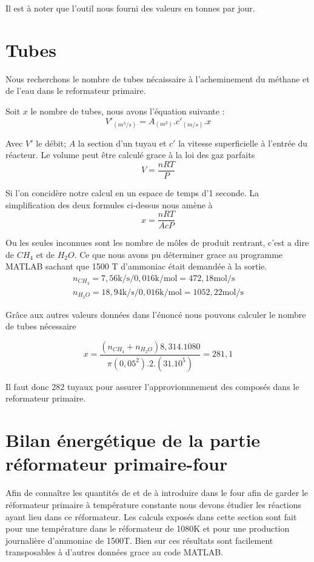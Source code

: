 \documentclass[a4paper, oneside, 12pt]{article}
\begin{document}
Il est à noter que l'outil nous fourni des valeurs en tonnes par jour.

\section{Tubes}

Nous recherchons le nombre de tubes nécaissaire à l'acheminement du 
méthane et de l'eau dans le reformateur primaire.

Soit $x$ le nombre de tubes, nous avons l'équation suivante :
\[
V'_{(m^3/s)} = A_{(m^2)}. c'_{(m/s)} .x
\]

Avec $V'$ le débit; $A$ la section d'un tuyau 
et $c'$ la vitesse superficielle à l'entrée du réacteur.
Le volume peut être calculé grace à la loi des gaz parfaits
\[
V=\frac{nRT}{P}
\]

Si l'on concidère notre calcul en un espace de temps d'1 seconde. 
La simplification des deux formules ci-dessus nous amène à
\[
x=\frac{nRT}{AcP}
\]

Ou les seules inconnues sont les nombre de môles de produit rentrant, 
c'est a dire de $CH_{4}$ et de $H_{2}O$. Ce que nous avons pu déterminer grace au 
programme MATLAB sachant que 1500 T d'ammoniac était demandée à la sortie.
\begin{align*}
	n_{CH_{4}} = 7,56 \si{\kilo\per\second} / 0,016 \si{\kilo\per\mole} 
	= 472,18 \si{\mole\per\second} \\
	n_{H_{2}O} = 18,94 \si{\kilo\per\second}/ 0,016 \si{\kilo\per\mole}
	= 1052,22 \si{\mole\per\second}
\end{align*}

Grâce aux autres valeurs données dans l'énoncé nous pouvons calculer le nombre de tubes nécessaire 

\[
x = \frac{(n_{CH_{4}}+n_{H_{2}O})8,314.1080}{\pi(0,05^2).2.(31.10^5)} = 281,1
\]

Il faut donc 282 tuyaux pour assurer l'approvionnnement des composés dans le reformateur primaire.

\section{Bilan énergétique de la partie réformateur primaire-four}

Afin de connaître les quantités de  et de  à introduire dans le four 
afin de garder le réformateur primaire à température constante nous devons étudier 
les réactions ayant lieu dans ce réformateur. Les calculs exposés dans cette section 
sont fait pour une température dans le réformateur de 1080K et pour une production 
journalière d'ammoniac de 1500T. Bien sur ces résultats sont facilement transposables
à d'autres données grace au code MATLAB.
\end{document}
